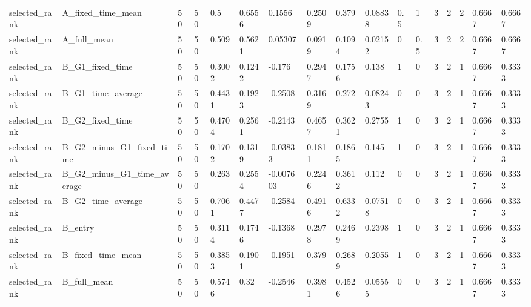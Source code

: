 \begin{longtable}{lllllllllllllllll}
selected\_rank & A\_fixed\_time\_mean & 50 & 50 & 0.5 & 0.6556 & 0.1556 & 0.2509 & 0.379 & 0.08838 & 0.5 & 1 & 3 & 2 & 2 & 0.6667 & 0.6667 \\
selected\_rank & A\_full\_mean & 50 & 50 & 0.509 & 0.5621 & 0.05307 & 0.0919 & 0.1094 & 0.02152 & 0 & 0.5 & 3 & 2 & 2 & 0.6667 & 0.6667 \\
selected\_rank & B\_G1\_fixed\_time & 50 & 50 & 0.3002 & 0.1242 & -0.176 & 0.2947 & 0.1756 & 0.138 & 1 & 0 & 3 & 2 & 1 & 0.6667 & 0.3333 \\
selected\_rank & B\_G1\_time\_average & 50 & 50 & 0.4431 & 0.1923 & -0.2508 & 0.3169 & 0.272 & 0.08243 & 0 & 0 & 3 & 2 & 1 & 0.6667 & 0.3333 \\
selected\_rank & B\_G2\_fixed\_time & 50 & 50 & 0.4704 & 0.2561 & -0.2143 & 0.4657 & 0.3621 & 0.2755 & 1 & 0 & 3 & 2 & 1 & 0.6667 & 0.3333 \\
selected\_rank & B\_G2\_minus\_G1\_fixed\_time & 50 & 50 & 0.1702 & 0.1319 & -0.03833 & 0.1811 & 0.1865 & 0.145 & 1 & 0 & 3 & 2 & 1 & 0.6667 & 0.3333 \\
selected\_rank & B\_G2\_minus\_G1\_time\_average & 50 & 50 & 0.263 & 0.2554 & -0.007603 & 0.2246 & 0.3612 & 0.112 & 0 & 0 & 3 & 2 & 1 & 0.6667 & 0.3333 \\
selected\_rank & B\_G2\_time\_average & 50 & 50 & 0.7061 & 0.4477 & -0.2584 & 0.4916 & 0.6332 & 0.07518 & 0 & 0 & 3 & 2 & 1 & 0.6667 & 0.3333 \\
selected\_rank & B\_entry & 50 & 50 & 0.3114 & 0.1746 & -0.1368 & 0.2978 & 0.2469 & 0.2398 & 1 & 0 & 3 & 2 & 1 & 0.6667 & 0.3333 \\
selected\_rank & B\_fixed\_time\_mean & 50 & 50 & 0.3853 & 0.1901 & -0.1951 & 0.379 & 0.2689 & 0.2055 & 1 & 0 & 3 & 2 & 1 & 0.6667 & 0.3333 \\
selected\_rank & B\_full\_mean & 50 & 50 & 0.5746 & 0.32 & -0.2546 & 0.3981 & 0.4526 & 0.05555 & 0 & 0 & 3 & 2 & 1 & 0.6667 & 0.3333 \\
\bottomrule
\end{longtable}
\endgroup
